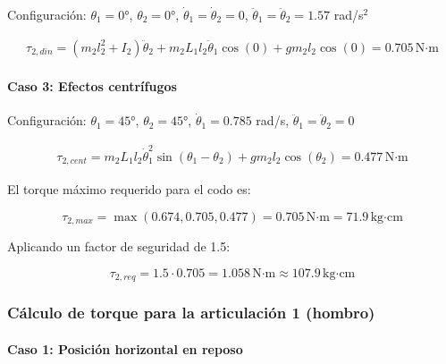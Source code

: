 Configuración: $\theta_1 = 0°$, $\theta_2 = 0°$, $\dot{\theta}_1 = \dot{\theta}_2 = 0$, $\ddot{\theta}_1 = \ddot{\theta}_2 = 1.57$ rad/s$^2$

\begin{multline}
\tau_{2,din} = (m_2l_2^2 + I_2)\ddot{\theta}_2 + m_2L_1l_2\ddot{\theta}_1\cos(0) + gm_2l_2\cos(0)
= 0.705 \, \text{N·m}
\end{multline}

\paragraph{Caso 3: Efectos centrífugos}

Configuración: $\theta_1 = 45°$, $\theta_2 = 45°$, $\dot{\theta}_1 = 0.785$ rad/s, $\ddot{\theta}_1 = \ddot{\theta}_2 = 0$

\begin{multline}
\tau_{2,cent} = m_2L_1l_2\dot{\theta}_1^2\sin(\theta_1 - \theta_2) + gm_2l_2\cos(\theta_2) 
= 0.477 \, \text{N·m}
\end{multline}

El torque máximo requerido para el codo es:

\begin{equation}
\tau_{2,max} = \max(0.674, 0.705, 0.477) = 0.705 \, \text{N·m} = 71.9 \, \text{kg·cm}
\end{equation}

Aplicando un factor de seguridad de 1.5:

\begin{equation}
\tau_{2,req} = 1.5 \cdot 0.705 = 1.058 \, \text{N·m} \approx 107.9 \, \text{kg·cm}
\end{equation}

\subsubsection{Cálculo de torque para la articulación 1 (hombro)}

\paragraph{Caso 1: Posición horizontal en reposo}

